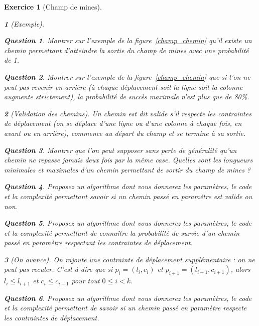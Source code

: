 \documentclass{article}
\theoremstyle{exostyle}
\newtheorem{exo}{Exercice}
\theoremstyle{partiestyle}
\newtheorem{partie}{}[exo]
\theoremstyle{questionstyle}
\newtheorem{questionpartie}{Question}[partie]
\begin{document}
\begin{exo}[Champ de mines]
    \begin{partie}[Exemple]
        \begin{questionpartie}
            Montrer sur l'exemple de la figure~\ref{champ_chemin} qu'il existe un chemin permettant d'atteindre la sortie du champ de mines avec une probabilité de 1.
        \end{questionpartie}
        \begin{questionpartie}
            Montrer sur l'exemple de la figure~\ref{champ_chemin} que si l'on ne peut pas revenir en arrière (à chaque déplacement soit la ligne soit la colonne augmente strictement), la probabilité de succès maximale n'est plus que de 80\%.
        \end{questionpartie}
    \end{partie}
    \begin{partie}[Validation des chemins]

        Un chemin est dit {\it valide} s'il respecte les contraintes de déplacement (on se déplace d'une ligne ou d'une colonne à chaque fois, en avant ou en arrière), commence au départ du champ et se termine à sa sortie.
        \begin{questionpartie}
     Montrer que l'on peut supposer sans perte de généralité qu'un chemin ne repasse jamais deux fois par la même case. Quelles sont les longueurs minimales et maximales d'un chemin permettant de sortir du champ de mines ?
        \end{questionpartie}
        \begin{questionpartie}
            Proposez un algorithme dont vous donnerez les paramètres, le code et la complexité permettant savoir si un chemin passé en paramètre est valide ou non.
        \end{questionpartie}
        \begin{questionpartie}
            Proposez un algorithme dont vous donnerez les paramètres, le code et la complexité permettant de connaître la probabilité de survie d'un chemin passé en paramètre respectant les contraintes de déplacement.
        \end{questionpartie}
    \end{partie}
    \begin{partie}[On avance]
        On rajoute une contrainte de déplacement supplémentaire : on ne peut pas reculer. C'est à dire que si $p_i = (l_i, c_i)$ et $p_{i+1} = (l_{i+1}, c_{i+1})$, alors $l_{i}\leq l_{i+1}$ et $c_{i} \leq c_{i+1}$ pour tout $0\leq i < k$.

        \begin{questionpartie}
            Proposez un algorithme dont vous donnerez les paramètres, le code et la complexité permettant de savoir si un chemin passé en paramètre respecte les contraintes de déplacement.
        \end{questionpartie}
            

\end{partie}
\end{exo}
\end{document}
